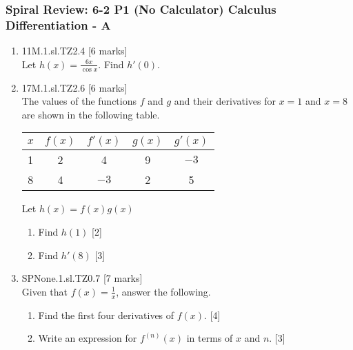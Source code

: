 \documentclass[12pt, twoside]{article}
\begin{document}
\subsubsection*{Spiral Review: 6-2 P1 (No Calculator) Calculus Differentiation - A}
 \begin{enumerate}

  \item 11M.1.sl.TZ2.4 \hfill [6 marks]\\
  Let $h(x)= \frac{6x}{\cos x}$. Find $h'(0)$. \vspace{2cm}

  \item 17M.1.sl.TZ2.6 \hfill [6 marks]\\
  The values of the functions $f$ and $g$ and their derivatives for $x=1$ and $x=8$ are shown in the following table.
  \begin{center}
    \begin{tabular}{|c|c|c|c|c|}
      \hline
      $x$ & $f(x)$ & $f'(x)$ & $g(x)$ & $g'(x)$ \\
      \hline
      1 & 2 & 4 & 9 & $-3$ \\
      \hline
      8 & 4 & $-3$ & 2 & 5 \\
      \hline
    \end{tabular}
  \end{center}
  Let $h(x)=f(x)g(x)$
  \begin{enumerate}
    \item Find $h(1)$ \hfill [2]
    \item Find $h'(8)$ \hfill [3]
  \end{enumerate} \vspace{2cm}


  \item SPNone.1.sl.TZ0.7 \hfill [7 marks]\\
  Given that $f(x)= \frac{1}{x}$, answer the following.
  \begin{enumerate}
    \item Find the first four derivatives of $f(x)$. \hfill [4]
    \item Write an expression for $f^{(n)}(x)$ in terms of $x$ and $n$. \hfill [3]
  \end{enumerate}


  \end{enumerate}
  \newpage
\end{document}
